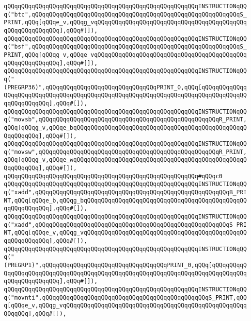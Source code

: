 \verb|qQQqqQQqqQQqqQQqqQQqqQQqqQQqqQQqqQQqqQQqqQQqqQQqqQQqqQQqINSTRUCTIONqQQq("btc",qQQqqQQqqQQqqQQqqQQqqQQqqQQqqQQqqQQqqQQqqQQqqQQqqQQqqQQqqQQqS_PRINT,qQQq[qQQqe_v,qQQqg_vqQQqqQQqqQQqqQQqqQQqqQQqqQQqqQQqqQQqqQQqqQQqqQQqqQQqqQQqqQQq],qQQq#[]),|\newline
\verb|qQQqqQQqqQQqqQQqqQQqqQQqqQQqqQQqqQQqqQQqqQQqqQQqqQQqqQQqINSTRUCTIONqQQq("bsf",qQQqqQQqqQQqqQQqqQQqqQQqqQQqqQQqqQQqqQQqqQQqqQQqqQQqqQQqqQQqS_PRINT,qQQq[qQQqg_v,qQQqe_vqQQqqQQqqQQqqQQqqQQqqQQqqQQqqQQqqQQqqQQqqQQqqQQqqQQqqQQqqQQq],qQQq#[]),|\newline
\verb|qQQqqQQqqQQqqQQqqQQqqQQqqQQqqQQqqQQqqQQqqQQqqQQqqQQqqQQqINSTRUCTIONqQQq("(PREGRP36)",qQQqqQQqqQQqqQQqqQQqqQQqqQQqqQQqPRINT_0,qQQq[qQQqqQQqqQQqqQQqqQQqqQQqqQQqqQQqqQQqqQQqqQQqqQQqqQQqqQQqqQQqqQQqqQQqqQQqqQQqqQQqqQQqqQQqqQQqqQQq],qQQq#[]),|\newline
\verb|qQQqqQQqqQQqqQQqqQQqqQQqqQQqqQQqqQQqqQQqqQQqqQQqqQQqqQQqINSTRUCTIONqQQq("movsb",qQQqqQQqqQQqqQQqqQQqqQQqqQQqqQQqqQQqqQQqqQQqqQQqqQQqR_PRINT,qQQq[qQQqg_v,qQQqe_bqQQqqQQqqQQqqQQqqQQqqQQqqQQqqQQqqQQqqQQqqQQqqQQqqQQqqQQqqQQq],qQQq#[]),|\newline
\verb|qQQqqQQqqQQqqQQqqQQqqQQqqQQqqQQqqQQqqQQqqQQqqQQqqQQqqQQqINSTRUCTIONqQQq("movsw",qQQqqQQqqQQqqQQqqQQqqQQqqQQqqQQqqQQqqQQqqQQqqQQqqQQqR_PRINT,qQQq[qQQqg_v,qQQqe_wqQQqqQQqqQQqqQQqqQQqqQQqqQQqqQQqqQQqqQQqqQQqqQQqqQQqqQQqqQQq],qQQq#[]),|\newline
\verb|qQQqqQQqqQQqqQQqqQQqqQQqqQQqqQQqqQQqqQQqqQQqqQQqqQQqqQQq#qQQqc0|\newline
\verb|qQQqqQQqqQQqqQQqqQQqqQQqqQQqqQQqqQQqqQQqqQQqqQQqqQQqqQQqINSTRUCTIONqQQq("xadd",qQQqqQQqqQQqqQQqqQQqqQQqqQQqqQQqqQQqqQQqqQQqqQQqqQQqqQQqB_PRINT,qQQq[qQQqe_b,qQQqg_bqQQqqQQqqQQqqQQqqQQqqQQqqQQqqQQqqQQqqQQqqQQqqQQqqQQqqQQqqQQq],qQQq#[]),|\newline
\verb|qQQqqQQqqQQqqQQqqQQqqQQqqQQqqQQqqQQqqQQqqQQqqQQqqQQqqQQqINSTRUCTIONqQQq("xadd",qQQqqQQqqQQqqQQqqQQqqQQqqQQqqQQqqQQqqQQqqQQqqQQqqQQqqQQqS_PRINT,qQQq[qQQqe_v,qQQqg_vqQQqqQQqqQQqqQQqqQQqqQQqqQQqqQQqqQQqqQQqqQQqqQQqqQQqqQQqqQQq],qQQq#[]),|\newline
\verb|qQQqqQQqqQQqqQQqqQQqqQQqqQQqqQQqqQQqqQQqqQQqqQQqqQQqqQQqINSTRUCTIONqQQq("(PREGRP1)",qQQqqQQqqQQqqQQqqQQqqQQqqQQqqQQqqQQqPRINT_0,qQQq[qQQqqQQqqQQqqQQqqQQqqQQqqQQqqQQqqQQqqQQqqQQqqQQqqQQqqQQqqQQqqQQqqQQqqQQqqQQqqQQqqQQqqQQqqQQqqQQq],qQQq#[]),|\newline
\verb|qQQqqQQqqQQqqQQqqQQqqQQqqQQqqQQqqQQqqQQqqQQqqQQqqQQqqQQqINSTRUCTIONqQQq("movnti",qQQqqQQqqQQqqQQqqQQqqQQqqQQqqQQqqQQqqQQqqQQqqQQqS_PRINT,qQQq[qQQqe_v,qQQqg_vqQQqqQQqqQQqqQQqqQQqqQQqqQQqqQQqqQQqqQQqqQQqqQQqqQQqqQQqqQQq],qQQq#[]),|\newline
